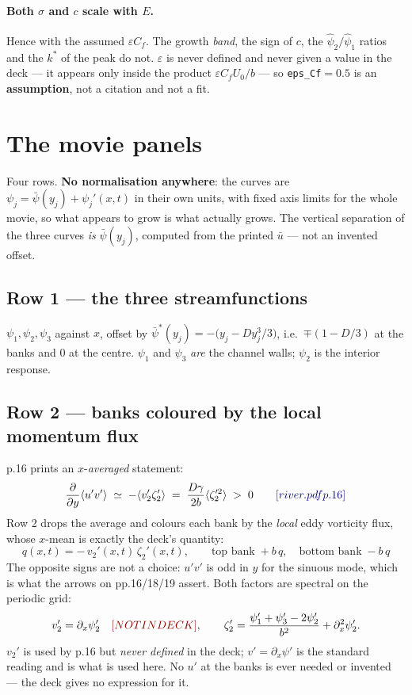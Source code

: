 \documentclass[11pt]{article}
\newcommand{\code}[1]{\texttt{\small #1}}
\newcommand{\deck}[1]{{\color{blue!45!black}\small[river.pdf p.#1]}}
\newcommand{\notdeck}{{\color{red!55!black}\small[NOT IN DECK]}}
\newcommand{\zt}{\zeta_2'}
\newcommand{\pt}{\psi_2'}
\newcommand{\po}{\psi_1'}
\newcommand{\ph}{\psi_3'}
\newcommand{\ks}{k^{*}}
\newcommand{\dx}{\partial_x}
\begin{document}
\paragraph{Both $\sigma$ and $c$ scale with $E$.} Hence with the assumed $\varepsilon C_f$.
The growth \emph{band}, the sign of $c$, the $\hat\psi_2/\hat\psi_1$ ratios and the $\ks$
of the peak do not. $\varepsilon$ is never defined and never given a value in the deck ---
it appears only inside the product $\varepsilon C_fU_0/b$ --- so \code{eps\_Cf}$=0.5$ is an
\textbf{assumption}, not a citation and not a fit.

\section{The movie panels}

Four rows. \textbf{No normalisation anywhere}: the curves are
$\psi_j=\bar\psi(y_j)+\psi_j'(x,t)$ in their own units, with fixed axis limits for the
whole movie, so what appears to grow is what actually grows. The vertical separation of
the three curves \emph{is} $\bar\psi(y_j)$, computed from the printed $\bar u$ --- not an
invented offset.

\subsection{Row 1 --- the three streamfunctions}
$\psi_1,\psi_2,\psi_3$ against $x$, offset by
$\bar\psi^{*}(y_j)=-\bigl(y_j-Dy_j^{3}/3\bigr)$, i.e.\ $\mp(1-D/3)$ at the banks and $0$
at the centre. $\psi_1$ and $\psi_3$ \emph{are} the channel walls; $\psi_2$ is the
interior response.

\subsection{Row 2 --- banks coloured by the local momentum flux}
\label{sec:flux}
p.16 prints an $x$-\emph{averaged} statement:
\begin{equation}
  \frac{\partial}{\partial y}\langle u'v'\rangle\;\simeq\;-\langle v_2'\zt\rangle
  \;=\;\frac{D\gamma}{2b}\langle\zt^{2}\rangle\;>\;0
  \qquad\deck{16}
  \label{eq:p16}
\end{equation}
Row 2 drops the average and colours each bank by the \emph{local} eddy vorticity flux,
whose $x$-mean is exactly the deck's quantity:
\begin{equation}
  \boxed{\;q(x,t)=-\,v_2'(x,t)\,\zt(x,t),\qquad
  \text{top bank}\;+b\,q,\quad\text{bottom bank}\;-b\,q\;}
\end{equation}
The opposite signs are not a choice: $u'v'$ is odd in $y$ for the sinuous mode, which is
what the arrows on pp.16/18/19 assert. Both factors are spectral on the periodic grid:
\begin{equation}
  v_2'=\dx\pt
  \quad\notdeck,\qquad
  \zt=\frac{\po+\ph-2\pt}{b^{2}}+\dx^{2}\pt .
\end{equation}
$v_2'$ is used by p.16 but \emph{never defined} in the deck; $v'=\dx\psi'$ is the standard
reading and is what is used here. No $u'$ at the banks is ever needed or invented --- the
deck gives no expression for it.
\end{document}
